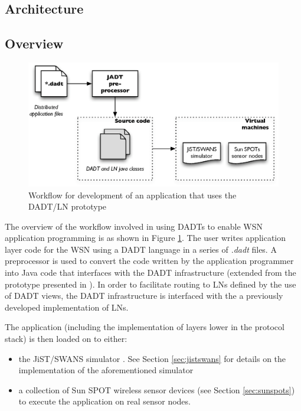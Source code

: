 \subsection{Architecture}



\subsection{Overview}
\begin{figure}
\centering
\includegraphics[width=\textwidth]{img/DADTLN_architecture.eps} 
\caption[DADT/LN application workflow]{Workflow for development of an application that uses
the DADT/LN prototype}
\label{Fig:DADTLN_architecture}
\end{figure} 
The overview of the workflow involved in using DADTs to enable WSN application
programming is as shown in Figure \ref{Fig:DADTLN_architecture}. The user writes
application layer code for the WSN using a DADT language in a series of
\emph{.dadt} files. A preprocessor is used to convert the code written by the
application programmer into Java code that interfaces with the DADT
infrastructure (extended from the prototype presented in
\cite{migliavacca_DADT:2006}). In order to facilitate routing to LNs defined by
the use of DADT views, the DADT infrastructure is interfaced with the a
previously developed implementation of LNs. 

The application (including the implementation of layers lower in the protocol
stack) is then loaded on to either:
\begin{itemize}
\item the JiST/SWANS simulator \cite{barr_JIST:2005, barr_SWANS}. See Section \ref{sec:jistswans} for details on the implementation of
the aforementioned simulator
\item a collection of Sun SPOT wireless sensor devices \cite{simon_squawk:2006}
(see Section \ref{sec:sunspots}) to execute the application on real sensor nodes.
\end{itemize}

